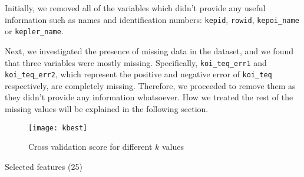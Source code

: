 Initially, we removed all of the variables which didn't provide any useful information
such as names and identification numbers: \texttt{kepid}, \texttt{rowid}, 
\texttt{kepoi\_name} or \texttt{kepler\_name}.

Next, we investigated the presence of missing data in the dataset, and we found that three
variables were mostly missing. Specifically, \texttt{koi\_teq\_err1} and 
\texttt{koi\_teq\_err2}, which represent the positive and negative error 
of \texttt{koi\_teq} respectively, are completely missing. Therefore, we proceeded to 
remove them as they didn't provide any information whatsoever. How we treated the rest
of the missing values will be explained in the following section.

\begin{figure}[H]
    \centering
    \texttt{[image: kbest]}
    \caption{Cross validation score for different $k$ values}%
    \label{fig:feature_cross}
\end{figure}

\begin{table}[H]
    \centering
    \caption{Selected features (25)}%
    \label{tab:features}
    
\end{table}